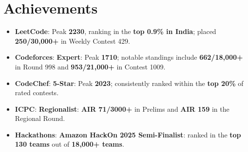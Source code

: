 \documentclass[letterpaper,10pt]{article}
\newcommand{\achievementItem}[2]{\item\small{\textbf{#1}{: #2}}}
\begin{document}
\section{Achievements}
\begin{itemize}[leftmargin=0in, label={}, itemsep=1pt, topsep=1pt, parsep=0pt, partopsep=0pt]
    \achievementItem{LeetCode}{Peak \textbf{2230}, ranking in the \textbf{top 0.9\% in India}; placed \textbf{250/30,000+} in Weekly Contest 429.}

    \achievementItem{Codeforces}{\textbf{Expert}: Peak \textbf{1710}; notable standings include \textbf{662/18,000+} in Round 998 and \textbf{953/21,000+} in Contest 1009.}

    \achievementItem{CodeChef}{\textbf{5-Star}: Peak \textbf{2023}; consistently ranked within the \textbf{top 20\%} of rated contests.}

    \achievementItem{ICPC}{\textbf{Regionalist}: \textbf{AIR 71/3000+} in Prelims and \textbf{AIR 159} in the Regional Round.}

    \achievementItem{Hackathons}{\textbf{Amazon HackOn 2025 Semi-Finalist}: ranked in the \textbf{top 130 teams} out of \textbf{18,000+ teams}.}
\end{itemize}
\vspace{2pt}
\end{document}
